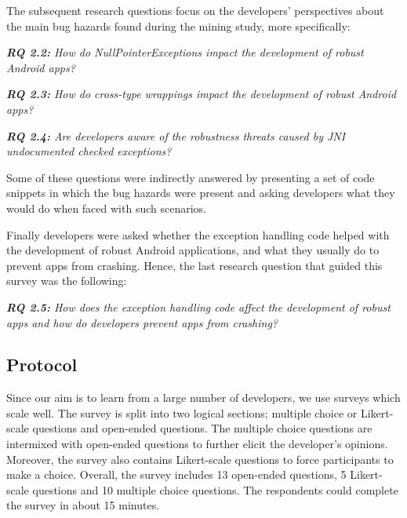 The subsequent research questions focus on the developers' perspectives about the main bug hazards found during the mining study, more specifically: 

\emph{\textbf{RQ 2.2:} How do NullPointerExceptions impact the development of robust Android apps?}

\emph{\textbf{RQ 2.3:} How do cross-type wrappings impact the development of robust Android apps?}

\emph{\textbf{RQ 2.4:} Are developers aware of the robustness threats caused by JNI undocumented checked exceptions?}




Some of these questions were indirectly answered by presenting a set of code snippets in which
the bug hazards were present and asking developers what they would do when faced with such scenarios.

Finally developers were asked whether the exception handling code helped with the development of robust Android applications, and what they usually do to prevent apps from crashing. Hence, the last research question that guided this survey was the following:

\emph{\textbf{RQ 2.5:} How does the exception handling code affect the development of robust apps and how do developers prevent apps from crashing?}

\subsection{Protocol}

Since our aim is to learn from a large number of developers, we use surveys which scale well.
The survey is split into two logical sections; multiple choice or Likert-scale questions and open-ended questions. The multiple choice questions are intermixed with open-ended questions to further elicit the developer's opinions. Moreover, the survey also contains Likert-scale questions to force participants to make a choice. Overall, the survey includes 13 open-ended questions, 5 Likert-scale questions and 10 multiple choice questions. The respondents could complete the survey in about 15 minutes.

